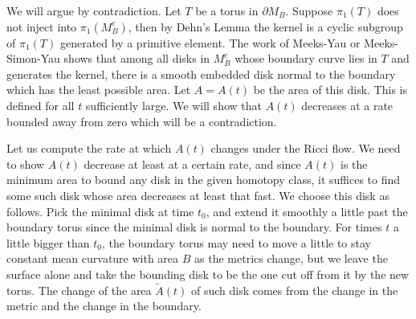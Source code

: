 We will argue by contradiction. Let $T$ be a torus in $\partial
M_B$. Suppose $\pi_1(T)$ does not inject into $\pi_1(M_B^c)$, then
by Dehn's Lemma the kernel is a cyclic subgroup of $\pi_1(T)$
generated by a primitive element. The work of Meeks-Yau \cite{MY}
or Meeks-Simon-Yau \cite{MSY} shows that among all disks in
$M_B^c$ whose boundary curve lies in $T$ and generates the kernel,
there is a smooth embedded disk normal to the boundary which has
the least possible area. Let $A=A(t)$ be the area of this disk.
This is defined for all $t$ sufficiently large. We will show that
$A(t)$ decreases at a rate bounded away from zero which will be a
contradiction.

Let us compute the rate at which $A(t)$ changes under the Ricci
flow. We need to show $A(t)$ decrease at least at a certain rate,
and since $A(t)$ is the minimum area to bound any disk in the
given homotopy class, it suffices to find some such disk whose
area decreases at least that fast. We choose this disk as follows.
Pick the minimal disk  at time $t_0$, and extend it smoothly a
little past the boundary torus since the minimal disk is normal to
the boundary. For times $t$ a little bigger than $t_0$, the
boundary torus may need to move a little to stay constant mean
curvature with area $B$ as the metrics change, but we leave the
surface alone and take the bounding disk to be the one cut off
from it by the new torus. The change of the area $\tilde{A}(t)$ of
such disk comes from the change in the metric and the change in
the boundary.


